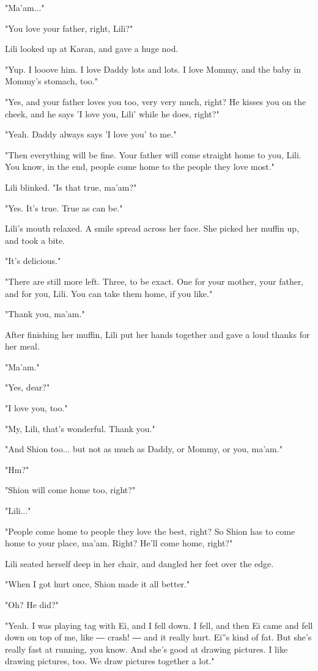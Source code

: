 "Ma'am..."

"You love your father, right, Lili?"

Lili looked up at Karan, and gave a huge nod.

"Yup. I looove him. I love Daddy lots and lots. I love Mommy, and the
baby in Mommy's stomach, too."

"Yes, and your father loves you too, very very much, right? He kisses
you on the cheek, and he says 'I love you, Lili' while he does, right?"

"Yeah. Daddy always says 'I love you' to me."

"Then everything will be fine. Your father will come straight home to
you, Lili. You know, in the end, people come home to the people they
love most."

Lili blinked. "Is that true, ma'am?"

"Yes. It's true. True as can be."

Lili's mouth relaxed. A smile spread across her face. She picked her
muffin up, and took a bite.

"It's delicious."

"There are still more left. Three, to be exact. One for your mother,
your father, and for you, Lili. You can take them home, if you like."

"Thank you, ma'am."

After finishing her muffin, Lili put her hands together and gave a loud
thanks for her meal.

"Ma'am."

"Yes, dear?"

"I love you, too."

"My, Lili, that's wonderful. Thank you."

"And Shion too... but not as much as Daddy, or Mommy, or you, ma'am."

"Hm?"

"Shion will come home too, right?"

"Lili..."

"People come home to people they love the best, right? So Shion has to
come home to your place, ma'am. Right? He'll come home, right?"

Lili seated herself deep in her chair, and dangled her feet over the
edge.

"When I got hurt once, Shion made it all better."

"Oh? He did?"

"Yeah. I was playing tag with Ei, and I fell down. I fell, and then Ei
came and fell down on top of me, like ― crash! ― and it really hurt.
Ei''s kind of fat. But she's really fast at running, you know. And she's
good at drawing pictures. I like drawing pictures, too. We draw pictures
together a lot."

